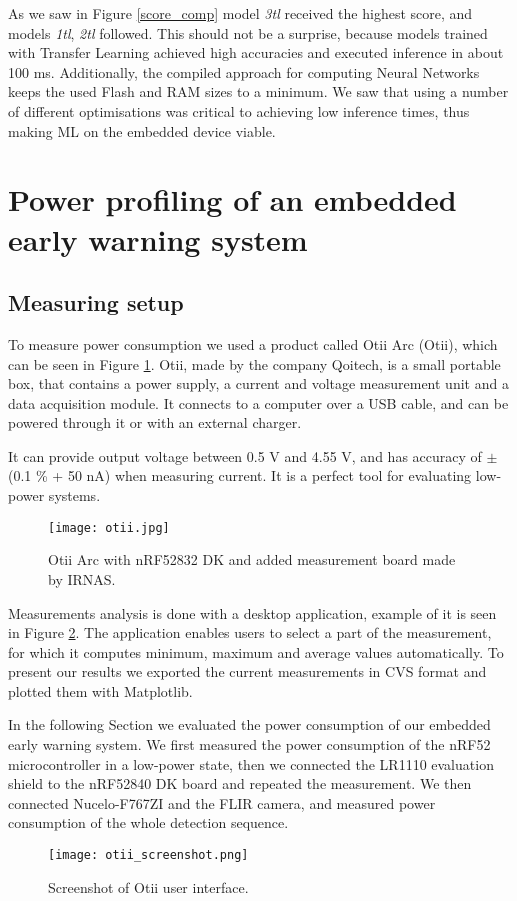 As we saw in Figure \ref{score_comp} model \textit{3tl} received the highest score, and models \textit{1tl}, \textit{2tl} followed.
This should not be a surprise, because models trained with Transfer Learning achieved high accuracies and executed inference in about 100 \si{\milli\second}. 
Additionally, the compiled approach for computing Neural Networks keeps the used Flash and RAM sizes to a minimum.
We saw that using a number of different optimisations was critical to achieving low inference times, thus making ML on the embedded device viable.

\section{ Power profiling of an embedded early warning system}

\subsection{ Measuring setup}

To measure power consumption we used a product called Otii Arc (Otii), which can be seen in Figure \ref{otii}.
Otii, made by the company Qoitech, is a small portable box, that contains a power supply, a current and voltage measurement unit and a data acquisition module.
It connects to a computer over a USB cable, and can be powered through it or with an external charger.

It can provide output voltage between 0.5 V and 4.55 V, and has accuracy of $\pm$(0.1 \% + 50 nA) when measuring current.
It is a perfect tool for evaluating low-power systems.
\newline
\begin{figure}[ht]
    \centering
    \texttt{[image: otii.jpg]}
    \caption{ Otii Arc with nRF52832 DK and added measurement board made by IRNAS.}
    \label{otii}
\end{figure}

Measurements analysis is done with a desktop application, example of it is seen in Figure \ref{otii_screen}. 
The application enables users to select a part of the measurement, for which it computes minimum, maximum and average values automatically.
To present our results we exported the current measurements in CVS format and plotted them with Matplotlib.

In the following Section we evaluated the power consumption of our embedded early warning system.
We first measured the power consumption of the nRF52 microcontroller in a low-power state, then we connected the LR1110 evaluation shield to the nRF52840 DK board and repeated the measurement.
We then connected Nucelo-F767ZI and the FLIR camera, and measured power consumption of the whole detection sequence.
\begin{figure}[ht]
    \centering
    \texttt{[image: otii\_screenshot.png]}
    \caption{ Screenshot of Otii user interface.}
    \label{otii_screen}
\end{figure}

